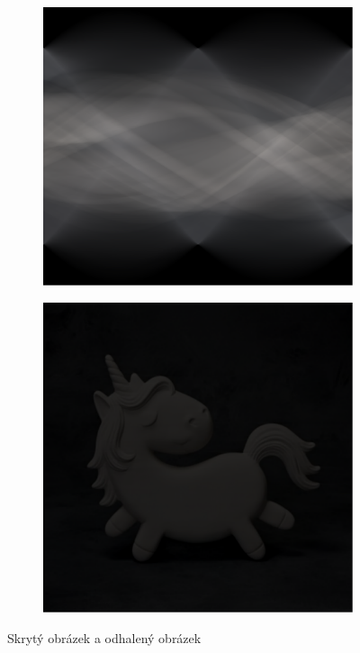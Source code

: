 \documentclass{beamer}
\begin{document}
\begin{frame}
\begin{figure}
\centering
\begin{subfigure}{.5\textwidth}
  \centering
  \includegraphics[width=.8\linewidth]{secret-radon.pdf}
  \label{fig:sub1}
\end{subfigure}%
\begin{subfigure}{.5\textwidth}
  \centering
  \includegraphics[width=.8\linewidth]{unicorn.pdf}
  \label{fig:sub2}
\end{subfigure}
\caption{Skrytý obrázek a odhalený obrázek}
\label{fig:test}
\end{figure}

\end{frame}
\end{document}
